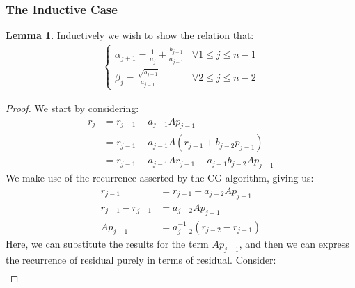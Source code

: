 \documentclass[]{article}
\theoremstyle{definition}
\newtheorem{lemma}{Lemma}[subsection]    %
\begin{document}
\begin{appendices}
            \subsubsection{The Inductive Case}
                \begin{lemma}
                    Inductively we wish to show the relation that: 
                    \begin{align}
                        \begin{cases}
                            \alpha_{j + 1} = \frac{1}{a_j} + \frac{b_{j - 1}}{a_{j - 1}}
                            & \forall 1 \le j \le n - 1
                            \\
                            \beta_{j} = \frac{\sqrt{b_{j - 1}}}{a_{j - 1}}
                            & \forall 2 \le j \le n - 2 
                        \end{cases}
                    \end{align}
                \end{lemma}
                \begin{proof}
                    We start by considering: 
                    \begin{align}
                        r_j &= r_{j - 1} - a_{j -1 }Ap_{j - 1}
                        \\
                        & =r_{j - 1} - a_{j - 1} A(r_{j - 1} + b_{j - 2}p_{j - 1})
                        \\
                        &= r_{j - 1} - a_{j - 1}Ar_{j - 1} - a_{j - 1}b_{j - 2}Ap_{j - 1}
                    \end{align}
                    We make use of the recurrence asserted by the CG algorithm, giving us: 
                    \begin{align}
                        r_{j - 1} &= r_{j - 1} - a_{j - 2}Ap_{j - 1}
                        \\
                        r_{j - 1} - r_{j - 1} &= a_{j - 2} Ap_{j - 1}
                        \\
                        Ap_{j - 1} &= a^{-1}_{j -2} 
                        \left(
                            r_{j - 2} - r_{j - 1}
                        \right)
                    \end{align}
                    Here, we can substitute the results for the term $Ap_{j - 1}$, and then we can express the recurrence of residual purely in terms of residual. Consider: 
                    \begin{align}

\end{align}
\end{proof}
\end{appendices}
\end{document}
